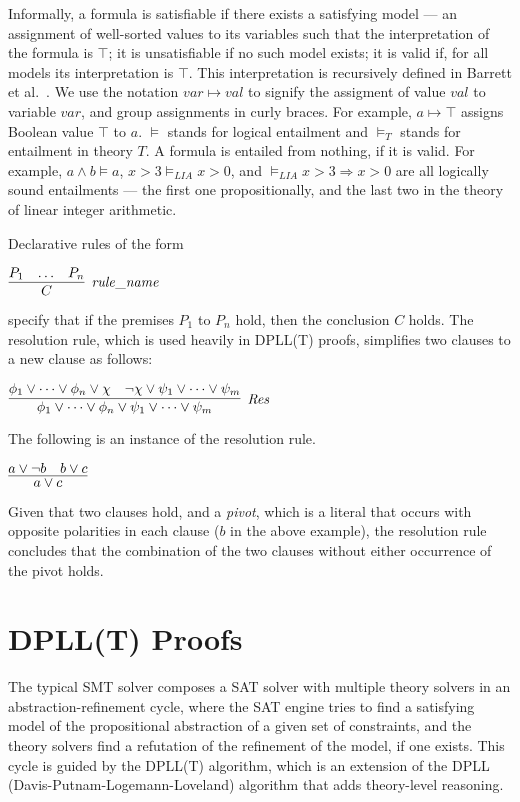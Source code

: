 \documentclass[11pt]{article}
\begin{document}
	Informally, a formula is satisfiable
	if there exists a satisfying model 
	--- an assignment of well-sorted 
	values to its variables such that 
	the interpretation of the formula 
	is $\top$; it is unsatisfiable if 
	no such model exists; it is valid
	if, for all models its interpretation
	is $\top$. This interpretation 
	is recursively defined in 
	Barrett et al.~\cite{Barrett2018}.
	We use the notation
	$var \mapsto val$ to signify the 
	assigment of value $val$ to 
	variable $var$, and group 
	assignments in curly braces. 
	For example, 
	$a \mapsto \top$ assigns Boolean value 
	$\top$ to $a$. $\models$ stands for 
	logical entailment and $\models_T$ 
	stands for entailment in theory $T$. 
	A formula is entailed from nothing, 
	if it is valid. For example, 
	$a \land b \models a$,
	$x > 3 \models_{LIA} x > 0$, and 
	$\models_{LIA} x > 3 \Rightarrow 
	x > 0$ are all logically sound 
	entailments --- the first one 
	propositionally, and the
	last two in the theory of linear 
	integer arithmetic.
	
	Declarative rules of the form
	\begin{center}
		$\infer[\mathit{rule\_name}]{C}{P_1 & \ldots & P_n}$
	\end{center}
	specify that if the premises $P_1$ to 
	$P_n$ hold, then the conclusion $C$
	holds. The resolution rule,
	which is used heavily in DPLL(T) proofs,
	simplifies two 
	clauses to a new clause as follows:
	\begin{center}
		$\infer[\mathit{Res}]{\phi_1 \lor \cdots \lor 
			\phi_n \lor \psi_1 \lor \cdots \lor 
			\psi_m}{\phi_1 \lor \cdots \lor \phi_n 
			\lor \chi & \neg \chi \lor \psi_1 
			\lor \cdots \lor \psi_m}$ 
	\end{center}
	The following is an instance of the 
	resolution rule.
	\begin{center}
		$\infer{a \lor c}{a \lor \neg b 
			& b \lor c}$
	\end{center}
	Given that two clauses hold, 
	and a \textit{pivot}, which is a 
	literal that occurs with opposite 
	polarities in each clause ($b$ in 
	the above example), the resolution 
	rule concludes that 
	the combination of the two clauses 
	without either occurrence of the 
	pivot holds.
	

\section{DPLL(T) Proofs}
\label{sec:smtproofs}
	The typical SMT solver composes 
	a SAT solver with multiple theory
	solvers in an abstraction-refinement
	cycle, where the SAT engine 
	tries to find a satisfying 
	model of the propositional
	abstraction of a given set of 
	constraints, and the theory
	solvers find a refutation of 
	the refinement of the model, if 
	one exists.
	This cycle is guided by the 
	DPLL(T) algorithm, which is an
	extension of the 
	DPLL~\cite{Loveland2016}
	(Davis-Putnam-Logemann-Loveland) 
	algorithm that adds theory-level 
	reasoning.
	
\end{document}
